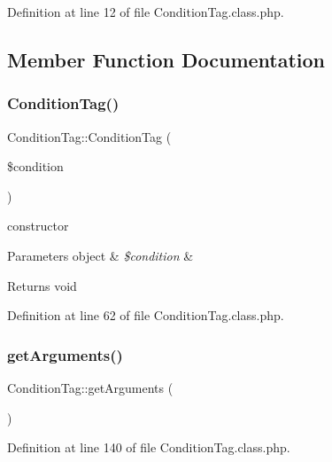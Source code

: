 Definition at line 12 of file Condition\+Tag.\+class.\+php.



\subsection{Member Function Documentation}
\mbox{\label{classConditionTag_af1d7974cb56dd8757cdd1fe04fb1de7e}} 
\subsubsection{\texorpdfstring{Condition\+Tag()}{ConditionTag()}}
{\footnotesize\ttfamily Condition\+Tag\+::\+Condition\+Tag (\begin{DoxyParamCaption}\item[{}]{\$condition }\end{DoxyParamCaption})}

constructor 
\begin{DoxyParams}[1]{Parameters}
object & {\em \$condition} & \\
\hline
\end{DoxyParams}
\begin{DoxyReturn}{Returns}
void 
\end{DoxyReturn}


Definition at line 62 of file Condition\+Tag.\+class.\+php.

\mbox{\label{classConditionTag_ad9c04c50390c7394e66a565e9afa456a}} 
\subsubsection{\texorpdfstring{get\+Arguments()}{getArguments()}}
{\footnotesize\ttfamily Condition\+Tag\+::get\+Arguments (\begin{DoxyParamCaption}{ }\end{DoxyParamCaption})}



Definition at line 140 of file Condition\+Tag.\+class.\+php.

\mbox{\label{classConditionTag_a0ba99a5ac27c8051ddf617306a89fadf}} 
